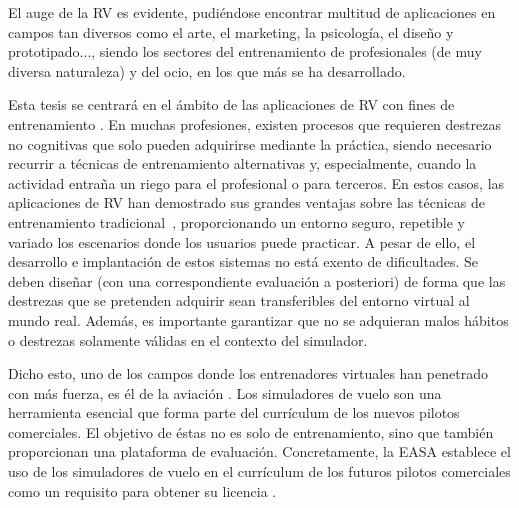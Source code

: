 
El auge de la \ac{RV} es evidente, pudiéndose encontrar multitud de aplicaciones en campos tan diversos como el arte, el marketing, la psicología, el diseño y prototipado..., siendo los sectores del entrenamiento de profesionales (de muy diversa naturaleza) y del ocio, en los que más se ha desarrollado.

Esta tesis se centrará en el ámbito de las aplicaciones de \ac{RV} con fines de entrenamiento . En muchas profesiones, existen procesos que requieren destrezas no cognitivas que solo pueden adquirirse mediante la práctica, siendo necesario recurrir a técnicas de entrenamiento alternativas y, especialmente, cuando la actividad entraña un riego para el profesional o para terceros. En estos casos, las aplicaciones de \ac{RV} han demostrado sus grandes ventajas sobre las técnicas de entrenamiento tradicional~\cite{PATEL2017266.e7}, proporcionando un entorno seguro, repetible y variado los escenarios donde los usuarios puede practicar. A pesar de ello, el desarrollo e implantación de estos sistemas no está exento de dificultades. Se deben diseñar (con una correspondiente evaluación a posteriori) de forma que las destrezas que se pretenden adquirir sean transferibles del entorno virtual al mundo real. Además, es importante garantizar que no se adquieran malos hábitos o destrezas solamente válidas en el contexto del simulador.

Dicho esto, uno de los campos donde los entrenadores virtuales han penetrado con más fuerza, es él de la aviación \cite{lee2017flight}. Los simuladores de vuelo son una herramienta esencial que forma parte del currículum de los nuevos pilotos comerciales\cite{piloto}. El objetivo de éstas no es solo de entrenamiento, sino que también proporcionan una plataforma de evaluación.  %
Concretamente, la \ac{EASA} establece el uso de los simuladores de vuelo en el currículum de los futuros pilotos comerciales como un requisito para obtener su licencia \cite{normativa}.

